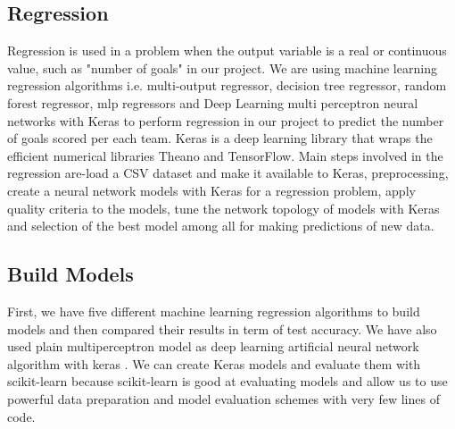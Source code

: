 \subsection{Regression}
Regression is used in a problem when the output variable is a real or continuous value, such as "number of goals" in our project. We are using machine learning regression algorithms i.e. multi-output regressor, decision tree regressor, random forest regressor, mlp regressors and Deep Learning multi perceptron neural networks with Keras to perform regression in our project to predict the number of goals scored per each team. Keras is a deep learning library that wraps the efficient numerical libraries Theano and TensorFlow. Main steps involved in the regression are-load a CSV dataset and make it available to Keras, preprocessing, create a neural network models with Keras for a regression problem, apply quality criteria to the models, tune the network topology of models with Keras and selection of the best model among all for making predictions of new data. 
\subsection{Build Models }
First, we have five different machine learning regression algorithms to build models and then compared their results in term of test accuracy.\newline \newline
We have also used plain multiperceptron model as deep learning artificial neural network algorithm with keras . We can create Keras models and evaluate them with scikit-learn because scikit-learn is good at evaluating models and allow us to use powerful data preparation and model evaluation schemes with very few lines of code.
